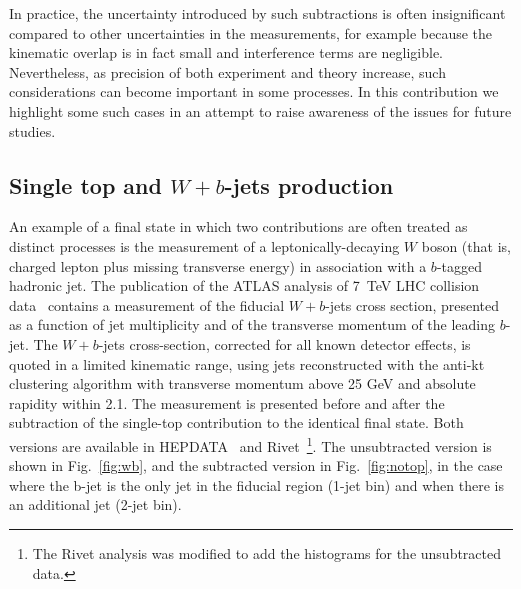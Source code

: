 \documentclass[11pt]{cernrep}
\begin{document}
In practice, the uncertainty introduced by such subtractions is often insignificant compared to other uncertainties in the measurements, 
for example because the kinematic overlap
is in fact small and interference terms are negligible. 
Nevertheless, as precision of both experiment and theory increase, such considerations can become important in some processes.
In this contribution we highlight some such cases in an attempt 
to raise awareness of the issues for future studies. 

\subsection{Single top and $W+b$-jets production}

An example of a final state in which two contributions are often treated as distinct processes is the measurement of a 
leptonically-decaying $W$ boson (that is, charged lepton plus missing transverse energy) in association with a $b$-tagged hadronic jet. 
The publication of the ATLAS analysis of 7~TeV LHC collision data~\cite{Aad:2013vka} contains a measurement of the fiducial $W+b$-jets
cross section, 
presented as a function of jet multiplicity and of the transverse momentum of the leading $b$-jet. 
The $W+b$-jets cross-section, corrected for all known detector effects, 
is quoted in a limited kinematic range, using jets reconstructed with the anti-kt
clustering algorithm with transverse momentum above 25 GeV and absolute rapidity within 2.1.
The measurement is presented before and after the subtraction of the single-top contribution to the identical final state. Both
versions are available in HEPDATA~\cite{hepdata} and Rivet~\cite{Buckley:2010ar}\footnote{The Rivet analysis was modified to add the histograms 
for the unsubtracted data.}. 
The unsubtracted version is shown in Fig.~\ref{fig:wb}, and the subtracted version in Fig.~\ref{fig:notop},
in the case where the b-jet is the only jet in the ﬁducial region (1-jet bin) and when there is an additional jet (2-jet bin).
 
\end{document}
